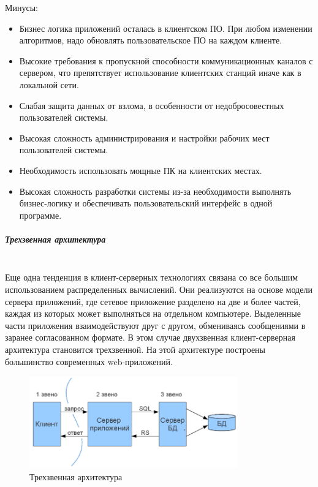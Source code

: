 Минусы:
\begin{itemize}
    \item 	Бизнес логика приложений осталась в клиентском ПО. При любом изменении алгоритмов, надо обновлять пользовательское ПО на каждом клиенте.
    \item Высокие требования к пропускной способности коммуникационных каналов с сервером, что препятствует использование клиентских станций иначе как в локальной сети.
    \item Слабая защита данных от взлома, в особенности от недобросовестных пользователей системы.
    \item Высокая сложность администрирования и настройки рабочих мест пользователей системы.
    \item Необходимость использовать мощные ПК на клиентских местах.
    \item Высокая сложность разработки системы из-за необходимости выполнять бизнес-логику и обеспечивать пользовательский интерфейс в одной программе.
\end{itemize}

\subparagraph{Трехзвенная архитектура}~\\

Еще одна тенденция в клиент-серверных технологиях связана со все большим
использованием распределенных вычислений. Они реализуются на основе модели сервера
приложений, где сетевое приложение разделено на две и более частей, каждая из которых
может выполняться на отдельном компьютере. Выделенные части приложения
взаимодействуют друг с другом, обмениваясь сообщениями в заранее согласованном
формате. В этом случае двухзвенная клиент-серверная архитектура становится
трехзвенной.  На этой архитектуре построены большинство современных web-приложений.~\\

\begin{figure}[h!]
    \centering
    \includegraphics[width=0.8\textwidth]{assets/664}
    \caption{Трехзвенная архитектура}
\end{figure}

